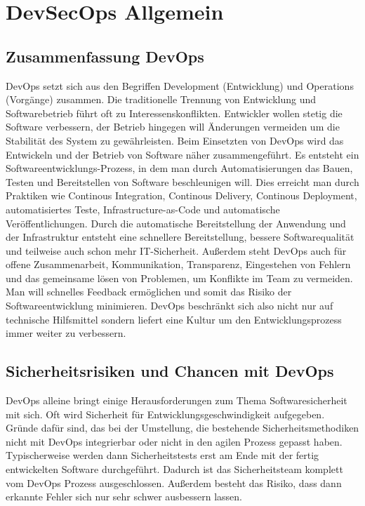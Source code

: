 \chapter{DevSecOps Allgemein}

\section{Zusammenfassung DevOps}
DevOps setzt sich aus den Begriffen \glqq Development \grqq{}(Entwicklung) und \glqq Operations \grqq{}(Vorgänge) zusammen. Die traditionelle Trennung von Entwicklung und Softwarebetrieb führt oft zu Interessenskonflikten. Entwickler wollen stetig die Software verbessern, der Betrieb hingegen will Änderungen vermeiden um die Stabilität des System zu gewährleisten. \cite{git-ops} Beim Einsetzten von DevOps wird das Entwickeln und der Betrieb von Software näher zusammengeführt. Es entsteht ein Softwareentwicklungs-Prozess, in dem man durch Automatisierungen das Bauen, Testen und Bereitstellen von Software beschleunigen will. Dies erreicht man durch Praktiken wie Continous Integration, Continous Delivery, Continous Deployment, automatisiertes Teste, Infrastructure-as-Code und automatische Veröffentlichungen. Durch die automatische Bereitstellung der Anwendung und der Infrastruktur entsteht eine schnellere Bereitstellung, bessere Softwarequalität und teilweise auch schon mehr IT-Sicherheit. \cite{dev-ops} Außerdem steht DevOps auch für offene Zusammenarbeit, Kommunikation, Transparenz, Eingestehen von Fehlern und das gemeinsame lösen von Problemen, um Konflikte im Team zu vermeiden. Man will schnelles Feedback ermöglichen und somit das Risiko der Softwareentwicklung minimieren. DevOps beschränkt sich also nicht nur auf technische Hilfsmittel sondern liefert eine Kultur um den Entwicklungsprozess immer weiter zu verbessern.\cite{git-ops}

\section{Sicherheitsrisiken und Chancen mit DevOps}
DevOps alleine bringt einige Herausforderungen zum Thema Softwaresicherheit mit sich. Oft wird Sicherheit für Entwicklungsgeschwindigkeit aufgegeben. Gründe dafür sind, das bei der Umstellung, die bestehende Sicherheitsmethodiken nicht mit DevOps integrierbar oder nicht in den agilen Prozess gepasst haben.
Typischerweise werden dann Sicherheitstests erst am Ende mit der fertig entwickelten Software durchgeführt. Dadurch ist das Sicherheitsteam komplett vom DevOps Prozess ausgeschlossen. Außerdem besteht das Risiko, dass dann erkannte Fehler sich nur sehr schwer ausbessern lassen.

